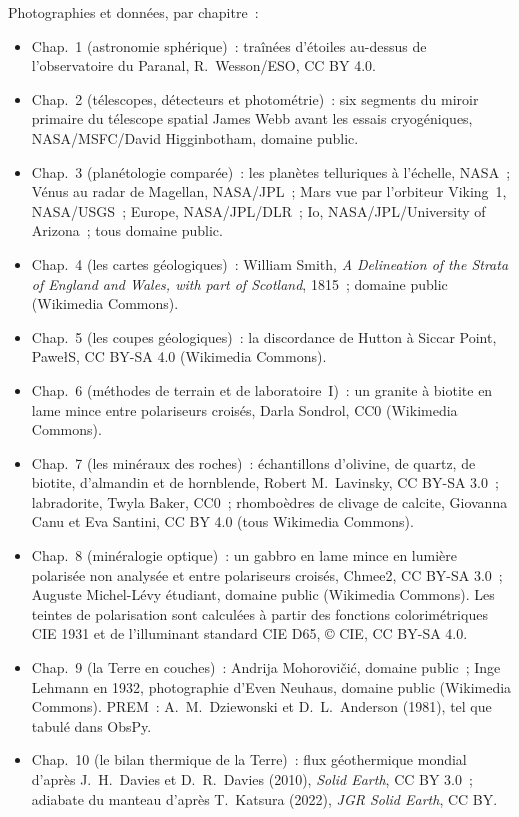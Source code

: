 \bigskip
\noindent Photographies et données, par chapitre~:
\begin{itemize}\small
  \item Chap.~1 (astronomie sphérique)~: traînées d'étoiles au-dessus de l'observatoire du Paranal, R.~Wesson/ESO, CC BY 4.0.
  \item Chap.~2 (télescopes, détecteurs et photométrie)~: six segments du miroir primaire du télescope spatial James Webb avant les essais cryogéniques, NASA/MSFC/David Higginbotham, domaine public.
  \item Chap.~3 (planétologie comparée)~: les planètes telluriques à l'échelle, NASA~; Vénus au radar de Magellan, NASA/JPL~; Mars vue par l'orbiteur Viking~1, NASA/USGS~; Europe, NASA/JPL/DLR~; Io, NASA/JPL/University of Arizona~; tous domaine public.
  \item Chap.~4 (les cartes géologiques)~: William Smith, \emph{A Delineation of the Strata of England and Wales, with part of Scotland}, 1815~; domaine public (Wikimedia Commons).
  \item Chap.~5 (les coupes géologiques)~: la discordance de Hutton à Siccar Point, PawełS, CC BY-SA 4.0 (Wikimedia Commons).
  \item Chap.~6 (méthodes de terrain et de laboratoire~I)~: un granite à biotite en lame mince entre polariseurs croisés, Darla Sondrol, CC0 (Wikimedia Commons).
  \item Chap.~7 (les minéraux des roches)~: échantillons d'olivine, de quartz, de biotite, d'almandin et de hornblende, Robert M.~Lavinsky, CC BY-SA 3.0~; labradorite, Twyla Baker, CC0~; rhomboèdres de clivage de calcite, Giovanna Canu et Eva Santini, CC BY 4.0 (tous Wikimedia Commons).
  \item Chap.~8 (minéralogie optique)~: un gabbro en lame mince en lumière polarisée non analysée et entre polariseurs croisés, Chmee2, CC BY-SA 3.0~; Auguste Michel-Lévy étudiant, domaine public (Wikimedia Commons). Les teintes de polarisation sont calculées à partir des fonctions colorimétriques CIE 1931 et de l'illuminant standard CIE D65, \copyright{} CIE, CC BY-SA 4.0.
  \item Chap.~9 (la Terre en couches)~: Andrija Mohorovičić, domaine public~; Inge Lehmann en 1932, photographie d'Even Neuhaus, domaine public (Wikimedia Commons). PREM~: A.~M.~Dziewonski et D.~L.~Anderson (1981), tel que tabulé dans ObsPy.
  \item Chap.~10 (le bilan thermique de la Terre)~: flux géothermique mondial d'après J.~H.~Davies et D.~R.~Davies (2010), \emph{Solid Earth}, CC BY 3.0~; adiabate du manteau d'après T.~Katsura (2022), \emph{JGR Solid Earth}, CC BY.

\end{itemize}
